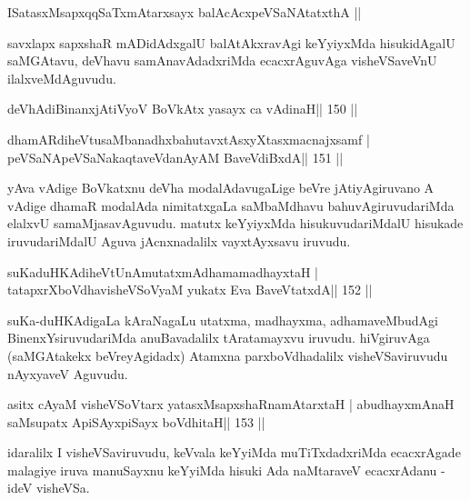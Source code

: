 
\begin{shl}
ISatasxMsapxqqSaTxmAtarxsayx balAcAcx\s\s peVSaNAtatxthA ||
\end{shl}

\begin{artha}
savxlapx sapxshaR mADidAdxgalU balAtAkxravAgi keYyiyxMda hisukidAgalU \-saMGAtavu, deVhavu samAnavAdadxriMda ecacxrAguvAga visheVSaveVnU ilalxveMdAguvudu.
\end{artha}

\begin{shl}
deVhAdiBinanxjAtiVyoV BoVkAtx yasayx ca vAdinaH\hfill || 150 ||
\end{shl}

\begin{shl}
dhamARdiheVtusaMbanadhxbahutavxtAsxyXtasxmacnajxsamf |
peVSaNApeVSaNakaqtaveVdanAyAM BaveVdiBxdA\hfill || 151 ||
\end{shl}

\begin{artha}
yAva vAdige BoVkatxnu deVha modalAdavugaLige beVre jAtiyAgiruvano A  vAdige dhamaR modalAda nimitatxgaLa saMbaMdhavu bahuvAgiruvudariMda  elalxvU samaMjasavAguvudu. matutx keYyiyxMda hisukuvudariMdalU   hisukade iruvudariMdalU Aguva jAcnxnadalilx vayxtAyxsavu iruvudu.
\end{artha}


\begin{shl}
suKaduHKAdiheVtUnAmutatxmAdhamamadhayxtaH |
tatapxrXboVdhavisheVSoV\s yaM yukatx Eva BaveVtatxdA\hfill || 152 ||
\end{shl}

\begin{artha}
suKa-duHKAdigaLa kAraNagaLu utatxma, madhayxma, adhamaveMbudAgi 
BinenxYsiruvudariMda anuBavadalilx tAratamayxvu iruvudu. hiVgiruvAga (saMGAtakekx beVreyAgidadx) Atamxna parxboVdhadalilx visheVSaviruvudu nAyxyaveV Aguvudu.
\end{artha}


\begin{shl}
asitx cAyaM visheVSoV\s tarx yatasxMsapxshaRnamAtarxtaH |
abudhayxmAnaH saMsupatx ApiSAyx\s\s piSayx boVdhitaH\hfill || 153 ||
\end{shl}

\begin{artha}
idaralilx I visheVSaviruvudu, keVvala keYyiMda muTiTxdadxriMda  ecacxrAgade malagiye iruva manuSayxnu keYyiMda hisuki Ada naMtaraveV ecacxrAdanu - ideV visheVSa.
\end{artha}

